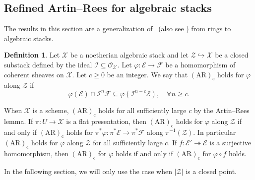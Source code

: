\documentclass[a4paper]{amsart}
\theoremstyle{plain}
\theoremstyle{definition}
\newtheorem{definition}[theorem]{Definition}
\theoremstyle{remark}
\numberwithin{equation}{section}
\newcommand{\inj}{\hookrightarrow} %
\newcommand{\surj}{\twoheadrightarrow} %
\newcommand{\stX}{\mathcal{X}} %
\newcommand{\stZ}{\mathcal{Z}} %
\newcommand{\sE}{\mathcal{E}} %
\newcommand{\sF}{\mathcal{F}} %
\newcommand{\sI}{\mathcal{I}} %
\newcommand{\AR}[1]{\mathrm{(AR)_{#1}}} %
\newcommand\oh{\mathcal{O}}
\newcommand{\spref}[1]{\href{http://stacks.math.columbia.edu/tag/#1}{#1}}
\begin{document}

\subsection{Refined Artin--Rees for algebraic stacks}
The results in this section are a generalization of~\cite[\S3]{conrad-dejong} (also
see \cite[Tag~\spref{07VD}]{stacks-project}) from rings to algebraic stacks.

\begin{definition}\label{D:AR}
Let $\stX$ be a noetherian algebraic stack and let $\stZ\inj \stX$ be a closed
substack defined by the ideal $\sI\subseteq \oh_\stX$. Let $\varphi\colon
\sE\to \sF$ be a homomorphism of coherent sheaves on $\stX$. Let $c\geq 0$ be
an integer. We say that $\AR{c}$ holds for $\varphi$ along $\stZ$ if
\[
\varphi(\sE)\cap \sI^n\sF \subseteq \varphi(\sI^{n-c}\sE),\quad \forall n\geq c .
\]
\end{definition}

When $\stX$ is a scheme, $\AR{c}$ holds for all sufficiently large $c$ by the
Artin--Rees lemma. If $\pi\colon U\to \stX$ is a flat presentation, then
$\AR{c}$ holds for $\varphi$ along $\stZ$ if and only if $\AR{c}$ holds for
$\pi^*\varphi\colon\pi^*\sE\to \pi^*\sF$ along $\pi^{-1}(\stZ)$. In particular
$\AR{c}$ holds for $\varphi$ along $\stZ$ for all sufficiently large $c$.
If $f\colon \sE'\surj \sE$ is a surjective homomorphism, then $\AR{c}$ for
$\varphi$ holds if and only if $\AR{c}$ for $\varphi\circ f$ holds.

In the following section, we will only use the case when $|\stZ|$ is a closed
point.
\end{document}

